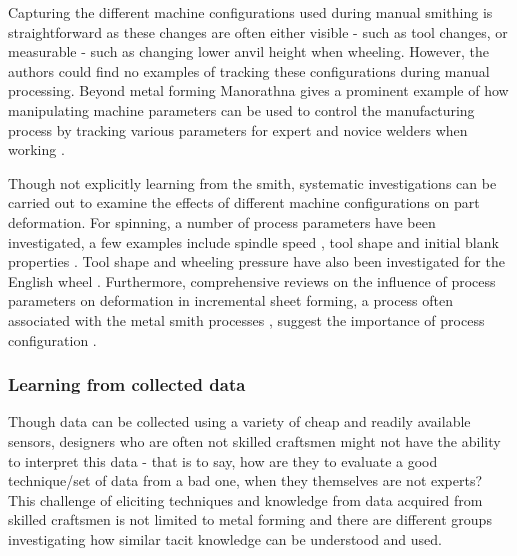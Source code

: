 Capturing the different machine configurations used during  manual smithing is straightforward as these changes are often either visible - such as tool changes, or measurable - such as changing lower anvil height when wheeling. However, the authors could find no examples of tracking these configurations during manual processing. Beyond metal forming Manorathna gives a prominent example of how manipulating machine parameters can be used to control the manufacturing process by tracking various parameters for expert and novice welders when working \citep{Manorathna2017HumanAutomation}. 

Though not explicitly learning from the smith, systematic investigations can be carried out to examine the effects of different machine configurations on part deformation. For spinning, a number of process parameters have been investigated, a few examples include spindle speed \citep{Sugar2016AnalysisSteels,Essa2010OptimizationAnalysis}, tool shape \citep{El-Khabeery1991OnCups,Essa2010OptimizationAnalysis} and initial blank properties \citep{Watson2015InvestigationMethod}. Tool shape and wheeling pressure have also been investigated for the English wheel \citep{Bowen2021NumericalProcess}. Furthermore, comprehensive reviews on the influence of process parameters on deformation in incremental sheet forming, a process often associated with the metal smith processes \citep{Music2012TheTools}, suggest the importance of process configuration \citep{Gatea2016ReviewForming,Gohil2021ReviewProcess}.

\subsubsection{Learning from collected data}
Though data can be collected using a variety of cheap and readily available sensors, designers who are often not skilled craftsmen might not have the ability to interpret this data - that is to say, how are they to evaluate a good technique/set of data from a bad one, when they themselves are not experts? 
This challenge of eliciting techniques and knowledge from data acquired from skilled craftsmen is not limited to metal forming and there are different groups investigating how similar tacit knowledge can be understood and used.

